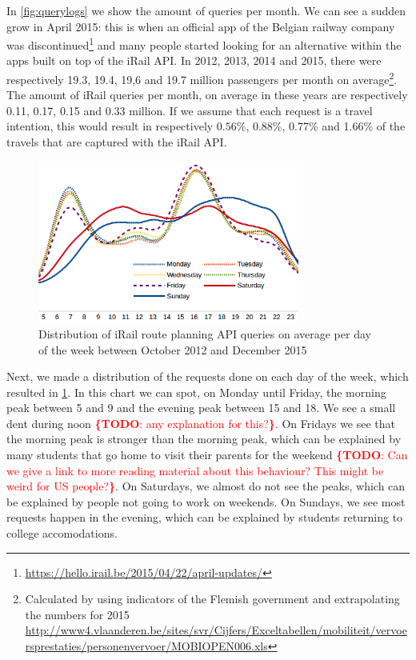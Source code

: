 \documentclass{sig-alternate}
\newcommand{\todo}[1]{\noindent\textcolor{red}{{\bf \{TODO}: #1{\bf \}}}}
\begin{document}
In \cref{fig:querylogs} we show the amount of queries per month.
We can see a sudden grow in April 2015: this is when an official app of the Belgian railway company was discontinued\footnote{\url{https://hello.irail.be/2015/04/22/april-updates/}} and many people started looking for an alternative within the apps built on top of the iRail API.
In 2012, 2013, 2014 and 2015, there were respectively 19.3, 19.4, 19,6 and 19.7 million passengers per month on average\footnote{Calculated by using indicators of the Flemish government and extrapolating the numbers for 2015 \url{http://www4.vlaanderen.be/sites/svr/Cijfers/Exceltabellen/mobiliteit/vervoersprestaties/personenvervoer/MOBIOPEN006.xls}}.
The amount of iRail queries per month, on average in these years are respectively 0.11, 0.17, 0.15 and 0.33 million.
If we assume that each request is a travel intention, this would result in respectively $0.56\%$, 0.88\%, 0.77\% and 1.66\% of the travels that are captured with the iRail API.

\begin{figure}
\centering
\includegraphics[width=8.6cm]{avg-all}
\caption{Distribution of iRail route planning API queries on average per day of the week between October 2012 and December 2015}
\label{fig:average}
\end{figure}

Next, we made a distribution of the requests done on each day of the week, which resulted in \cref{fig:average}.
In this chart we can spot, on Monday until Friday, the morning peak between 5 and 9 and the evening peak between 15 and 18.
We see a small dent during noon \todo{any explanation for this?}.
On Fridays we see that the morning peak is stronger than the morning peak, which can be explained by many students that go home to visit their parents for the weekend \todo{Can we give a link to more reading material about this behaviour? This might be weird for US people?}.
On Saturdays, we almost do not see the peaks, which can be explained by people not going to work on weekends.
On Sundays, we see most requests happen in the evening, which can be explained by students returning to college accomodations.
\end{document}
